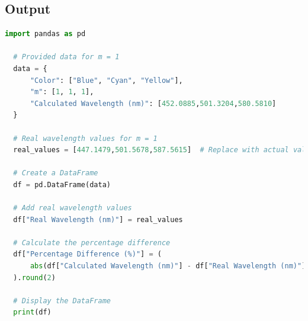 \documentclass[a4paper,11pt]{article}
\begin{document}
\subsection*{Output}
\begin{lstlisting}[language=Python]
  import pandas as pd

  # Provided data for m = 1
  data = {
      "Color": ["Blue", "Cyan", "Yellow"],
      "m": [1, 1, 1],
      "Calculated Wavelength (nm)": [452.0885,501.3204,580.5810]
  }
  
  # Real wavelength values for m = 1
  real_values = [447.1479,501.5678,587.5615]  # Replace with actual values
  
  # Create a DataFrame
  df = pd.DataFrame(data)
  
  # Add real wavelength values
  df["Real Wavelength (nm)"] = real_values
  
  # Calculate the percentage difference
  df["Percentage Difference (%)"] = (
      abs(df["Calculated Wavelength (nm)"] - df["Real Wavelength (nm)"]) / df["Real Wavelength (nm)"] * 100
  ).round(2)
  
  # Display the DataFrame
  print(df)
  
  
\end{lstlisting}
\newpage
%
\end{document}
